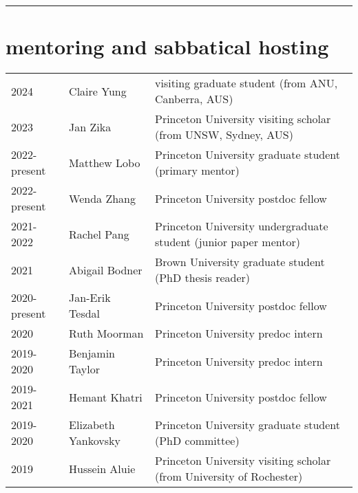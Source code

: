\documentclass{article}
\begin{document}
\noindent\rule{\textwidth}{1pt}
\vspace{-.5cm}
\section*{\sc  \color{Maroon} mentoring and sabbatical hosting}
\vspace{-.25cm}

\begin{tabular}{lll}

2024 & Claire Yung & visiting graduate student (from ANU, Canberra, AUS) \\

2023 & Jan Zika & Princeton University visiting scholar (from UNSW, Sydney, AUS) \\

2022-present & Matthew Lobo& Princeton University graduate student (primary mentor) \\

2022-present & Wenda Zhang& Princeton University postdoc fellow \\

2021-2022 & Rachel Pang& Princeton University undergraduate student (junior paper mentor) \\ 


2021 & Abigail Bodner& Brown University graduate student (PhD thesis reader) \\ 


2020-present & Jan-Erik Tesdal& Princeton University postdoc fellow \\ 

2020 & Ruth Moorman & Princeton University predoc intern \\ 

2019-2020 & Benjamin Taylor & Princeton University predoc intern \\ 

2019-2021 & Hemant Khatri & Princeton University postdoc fellow  \\ 

2019-2020 & Elizabeth Yankovsky & Princeton University graduate student (PhD committee) \\ 

2019     & Hussein Aluie & Princeton University visiting scholar (from University of Rochester)  \\ 


\end{tabular}
\end{document}
